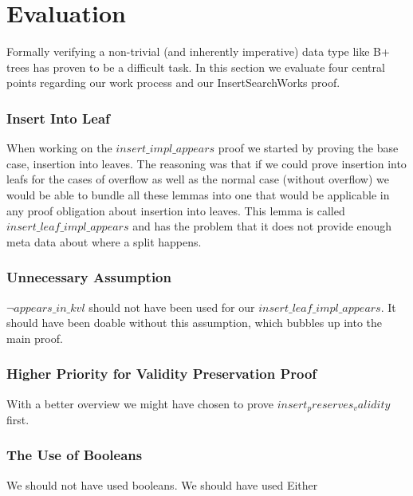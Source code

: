 \section{Evaluation}
\label{sec:Evaluation}
Formally verifying a non-trivial (and inherently imperative) data type like B+ trees has proven to be a difficult task. In this section we evaluate four central points regarding our work process and our InsertSearchWorks proof.
\subsubsection{Insert Into Leaf}
When working on the $insert\_impl\_appears$ proof we started by proving the base case, insertion into leaves. The reasoning was that if we could prove insertion into leafs for the cases of overflow as well as the normal case (without overflow) we would be able to bundle all these lemmas into one that would be applicable in any proof obligation about insertion into leaves. This lemma is called $insert\_leaf\_impl\_appears$ and has the problem that it does not provide enough meta data about where a split happens.
\subsubsection{Unnecessary Assumption}
$\lnot appears\_in\_kvl$ should not have been used for our $insert\_leaf\_impl\_appears$. It should have been doable without this assumption, which bubbles up into the main proof.
\subsubsection{Higher Priority for Validity Preservation Proof}
With a better overview we might have chosen to prove $insert_preserves_validity$ first.
\subsubsection{The Use of Booleans}
We should not have used booleans. We should have used Either